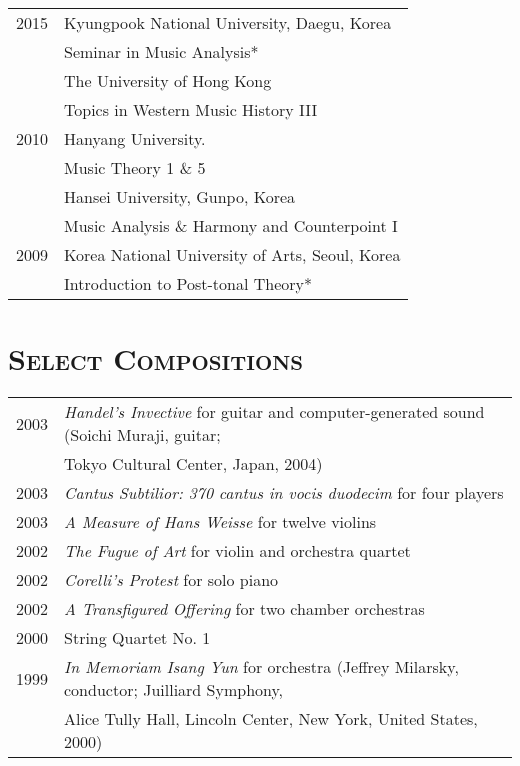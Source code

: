 \documentclass[letter,11pt]{article}
\begin{document}
  \hspace*{-0.25cm}
  \begin{tabular}{p{2.5cm} l}
    2015 & Kyungpook National University, Daegu, Korea\\
    & Seminar in Music Analysis*\\[1mm]
    
    & The University of Hong Kong\\
    & Topics in Western Music History III\\[1mm]
    
    2010 & Hanyang University.\\
    & Music Theory 1 \& 5\\[1mm]
    
    & Hansei University, Gunpo, Korea\\
    & Music Analysis \& Harmony and Counterpoint I\\[1mm]
    
    2009 & Korea National University of Arts, Seoul, Korea\\
    & Introduction to Post-tonal Theory*\\
  \end{tabular}
  
  \vspace{5mm}
  
  \section*{\textsc{Select Compositions}}
  
  \hspace*{-0.25cm}
  \begin{tabular}{p{2.5cm} p{12.5cm}}
    2003 & \textit{Handel’s Invective} for guitar and computer-generated sound
    (Soichi Muraji, guitar;\\
    & Tokyo Cultural Center, Japan, 2004)\\[2mm]
    
    2003 & \textit{Cantus Subtilior: 370 cantus in vocis duodecim} for four
    players\\[2mm]
    
    2003 & \textit{A Measure of Hans Weisse} for twelve violins\\[2mm]
    
    2002 & \textit{The Fugue of Art} for violin and orchestra quartet\\[2mm]
    
    2002 & \textit{Corelli’s Protest} for solo piano\\[2mm]
    
    2002 & \textit{A Transfigured Offering} for two chamber orchestras\\[2mm]
    
    2000 & String Quartet No. 1\\[2mm]
    
    1999 & \textit{In Memoriam Isang Yun} for orchestra (Jeffrey Milarsky,
    conductor; Juilliard Symphony,\\
    & Alice Tully Hall, Lincoln Center, New York, United States, 2000)
  \end{tabular}
  
\end{document}
